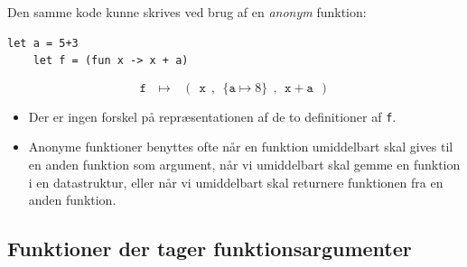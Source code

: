 \documentclass[rgb]{beamer}
\begin{document}
\begin{frame}[fragile]
\begin{footnotesize}

  \vspace{1ex}

  Den samme kode kunne skrives ved brug af en \emph{anonym} funktion:
  \begin{lstlisting}[numbers=none,frame=none,mathescape]
    let a = 5+3
    let f = (fun x -> x + a)
  \end{lstlisting}


 $$\mathtt{f} ~~~\mapsto ~~~ (~~\mathtt{x}~~, ~~\{\mathtt{a} \mapsto 8\}~~, ~~\mathtt{x + a}~~)$$

  \begin{itemize}
  \item Der er ingen forskel på repræsentationen af de to definitioner af \lstinline{f}.
  \item Anonyme funktioner benyttes ofte når en funktion umiddelbart
    skal gives til en anden funktion som argument, når vi umiddelbart
    skal gemme en funktion i en datastruktur, eller når vi umiddelbart
    skal returnere funktionen fra en anden funktion.
  \end{itemize}

\end{footnotesize}
\end{frame}

\subsection{Funktioner der tager funktionsargumenter}
\end{document}
